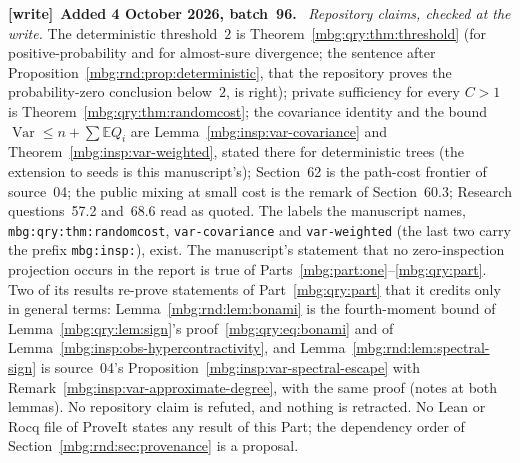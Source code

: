 \documentclass[11pt,letterpaper]{article}
\theoremstyle{definition}
\newcommand{\E}{\mathbb E}
\DeclareMathOperator{\Var}{Var}
\newenvironment{writenote}[1][]{\par\smallskip\begingroup\small
 \noindent\textbf{[write]}\if\relax\detokenize{#1}\relax\else~\textbf{#1.}\fi\ }%
 {\par\endgroup\smallskip}
\begin{document}
\begin{writenote}[Added 4 October 2026, batch~96]
\emph{Repository claims, checked at the write.} The deterministic threshold~$2$ is Theorem~\ref{mbg:qry:thm:threshold} (for positive-probability and for almost-sure divergence; the sentence after Proposition~\ref{mbg:rnd:prop:deterministic}, that the repository proves the probability-zero conclusion below~$2$, is right); private sufficiency for every $C>1$ is Theorem~\ref{mbg:qry:thm:randomcost}; the covariance identity and the bound $\Var\le n+\sum\E Q_i$ are Lemma~\ref{mbg:insp:var-covariance} and Theorem~\ref{mbg:insp:var-weighted}, stated there for deterministic trees (the extension to seeds is this manuscript's); Section~62 is the path-cost frontier of source~04; the public mixing at small cost is the remark of Section~60.3; Research questions~57.2 and~68.6 read as quoted. The labels the manuscript names, \texttt{mbg:qry:thm:randomcost}, \texttt{var-covariance} and \texttt{var-weighted} (the last two carry the prefix \texttt{mbg:insp:}), exist. The manuscript's statement that no zero-inspection projection occurs in the report is true of Parts~\ref{mbg:part:one}--\ref{mbg:qry:part}. Two of its results re-prove statements of Part~\ref{mbg:qry:part} that it credits only in general terms: Lemma~\ref{mbg:rnd:lem:bonami} is the fourth-moment bound of Lemma~\ref{mbg:qry:lem:sign}'s proof~\eqref{mbg:qry:eq:bonami} and of Lemma~\ref{mbg:insp:obs-hypercontractivity}, and Lemma~\ref{mbg:rnd:lem:spectral-sign} is source~04's Proposition~\ref{mbg:insp:var-spectral-escape} with Remark~\ref{mbg:insp:var-approximate-degree}, with the same proof (notes at both lemmas). No repository claim is refuted, and nothing is retracted. No Lean or Rocq file of ProveIt states any result of this Part; the dependency order of Section~\ref{mbg:rnd:sec:provenance} is a proposal.


\end{writenote}
\end{document}
